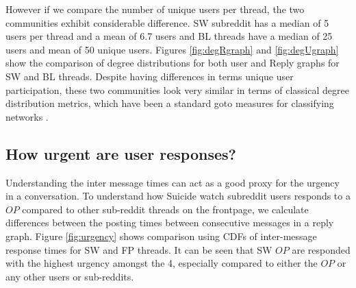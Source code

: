 However if we  compare the number of unique users per thread, the two communities exhibit considerable difference. SW subreddit has a median of 5 users per thread and a mean of 6.7 users and BL threads have a median of 25 users and mean of 50 unique users.
Figures \ref{fig:degRgraph} and \ref{fig:degUgraph} show the comparison of degree distributions for both user and Reply graphs for SW and BL threads. Despite having differences in terms unique user participation, these two communities look very similar in terms of classical degree distribution metrics, which have been a standard goto measures for classifying networks .

\subsection{How urgent are user responses?}
Understanding the inter message times can act as a good proxy for the urgency in a conversation. To understand how Suicide watch subreddit users responds to a $OP$ compared to other sub-reddit threads on the frontpage, we calculate differences between the posting times between consecutive messages in a reply graph. Figure \ref{fig:urgency} shows comparison using CDFs of inter-message response times for SW and FP threads. It can be seen that SW $OP$ are responded with the highest urgency amongst the 4, especially compared to either the $OP$ or any other users or sub-reddits. 

